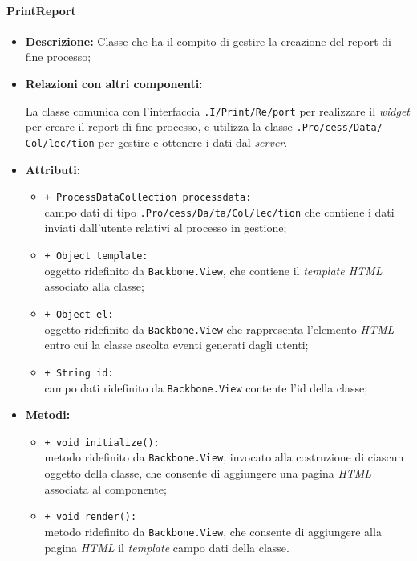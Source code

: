 \paragraph{PrintReport}
\label{printReport}
\begin{flushleft}
\begin{itemize}
\item \textbf{Descrizione:} Classe che ha il compito di gestire la creazione del report di fine processo;
\item \textbf{Relazioni con altri componenti:}
\begin{sloppypar}
La classe comunica con l'interfaccia \texttt{\viewUser{}.I\fshyp{}Print\fshyp{}Re\fshyp{}port} per realizzare il \textit{widget} per creare il report di fine processo, e utilizza la classe \texttt{\collection{}.Pro\fshyp{}cess\fshyp{}Data\fshyp{}Col\fshyp{}lec\fshyp{}tion} per gestire e ottenere i dati dal \textit{server}.
\end{sloppypar}
\item \textbf{Attributi:}
\begin{sloppypar}
\begin{itemize}
\item \texttt{+ ProcessDataCollection processdata:}\\ campo dati di tipo \texttt{\collection{}.Pro\fshyp{}cess\fshyp{}Da\fshyp{}ta\fshyp{}Col\fshyp{}lec\fshyp{}tion} che contiene i dati inviati dall'utente relativi al processo in gestione;
\item \texttt{+ Object template:}\\ oggetto ridefinito da \texttt{Backbone.View}, che contiene il \textit{template HTML} associato alla classe;
\item \texttt{+ Object el:}\\ oggetto ridefinito da \texttt{Backbone.View} che rappresenta l'elemento \textit{HTML} entro cui la classe ascolta eventi generati dagli utenti;
\item \texttt{+ String id:}\\ campo dati ridefinito da \texttt{Backbone.View} contente l'id della classe;
\end{itemize}
\end{sloppypar}
\item \textbf{Metodi:}
\begin{sloppypar}
\begin{itemize}
\item \texttt{+ void initialize():}\\ metodo ridefinito da \texttt{Backbone.View}, invocato alla costruzione di ciascun oggetto della classe, che consente di aggiungere una pagina \textit{HTML} associata al componente;
\item \texttt{+ void render():}\\ metodo ridefinito da \texttt{Backbone.View}, che consente di aggiungere alla pagina \textit{HTML} il \textit{template} campo dati della classe.
\end{itemize}
\end{sloppypar}
\end{itemize}
\end{flushleft}


